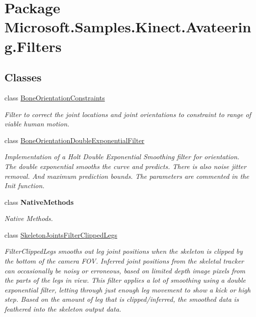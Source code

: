 \hypertarget{namespace_microsoft_1_1_samples_1_1_kinect_1_1_avateering_1_1_filters}{\section{Package Microsoft.\+Samples.\+Kinect.\+Avateering.\+Filters}
\label{namespace_microsoft_1_1_samples_1_1_kinect_1_1_avateering_1_1_filters}
}
\subsection*{Classes}
\begin{DoxyCompactItemize}
\item 
class \hyperlink{class_microsoft_1_1_samples_1_1_kinect_1_1_avateering_1_1_filters_1_1_bone_orientation_constraints}{Bone\+Orientation\+Constraints}
\begin{DoxyCompactList}\small\item\em Filter to correct the joint locations and joint orientations to constraint to range of viable human motion. \end{DoxyCompactList}\item 
class \hyperlink{class_microsoft_1_1_samples_1_1_kinect_1_1_avateering_1_1_filters_1_1_bone_orientation_double_exponential_filter}{Bone\+Orientation\+Double\+Exponential\+Filter}
\begin{DoxyCompactList}\small\item\em Implementation of a Holt Double Exponential Smoothing filter for orientation. The double exponential smooths the curve and predicts. There is also noise jitter removal. And maximum prediction bounds. The parameters are commented in the Init function. \end{DoxyCompactList}\item 
class {\bfseries Native\+Methods}
\begin{DoxyCompactList}\small\item\em Native Methods. \end{DoxyCompactList}\item 
class \hyperlink{class_microsoft_1_1_samples_1_1_kinect_1_1_avateering_1_1_filters_1_1_skeleton_joints_filter_clipped_legs}{Skeleton\+Joints\+Filter\+Clipped\+Legs}
\begin{DoxyCompactList}\small\item\em Filter\+Clipped\+Legs smooths out leg joint positions when the skeleton is clipped by the bottom of the camera F\+O\+V. Inferred joint positions from the skeletal tracker can occasionally be noisy or erroneous, based on limited depth image pixels from the parts of the legs in view. This filter applies a lot of smoothing using a double exponential filter, letting through just enough leg movement to show a kick or high step. Based on the amount of leg that is clipped/inferred, the smoothed data is feathered into the skeleton output data. \end{DoxyCompactList}\item 

\end{DoxyCompactItemize}
